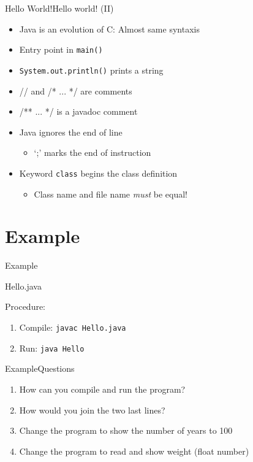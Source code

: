 \documentclass{beamer}
\begin{document}
\begin{frame}{Hello World!}{Hello world! (II)}
	\begin{itemize}
		\item Java is an evolution of C: Almost same syntaxis
     	\item Entry point in \texttt{main()}
		\item \texttt{System.out.println()} prints a string
		\item // and /* ... */ are comments
		\item /** ... */ is a \alert{javadoc} comment
		\item Java ignores the end of line
	    	\begin{itemize}
		 	\item `;' marks the end of instruction
 		 	\end{itemize}
		\item Keyword \texttt{class} begins the class definition
	    	\begin{itemize}
		 	\item Class name and file name \textit{must} be equal!
 		 	\end{itemize}
	\end{itemize}
\end{frame}

\section[Example]{Example}
\begin{frame}{Example}
	\vspace{-0.2cm}
	\begin{block}{Hello.java}
		
	\end{block}

	Procedure:
	\begin{enumerate}
		\item Compile: \texttt{javac Hello.java}
		\item Run: \texttt{java Hello}
	\end{enumerate}
\end{frame}

\begin{frame}{Example}{Questions}
	\begin{enumerate}
		\item How can you compile and run the program?
		\item How would you join the two last lines?
		\item Change the program to show the number of years to 100
		\item Change the program to read and show weight (float number)
	\end{enumerate}
\end{frame}
\end{document}

